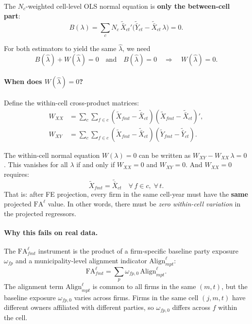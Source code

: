 \documentclass{article}
\newcommand{\FA}{\mathrm{FA}}
\theoremstyle{plain}
\theoremstyle{definition}
\begin{document}
The $N_c$-weighted cell-level OLS normal equation is \textbf{only the
between-cell part}:
\begin{equation}\label{eq:cell_normal}
  B(\lambda) = \sum_c N_c\, \tilde{\bar{X}}_{ct}'
  \bigl(\tilde{\bar{Y}}_{ct} - \tilde{\bar{X}}_{ct}\,\lambda\bigr) = 0.
\end{equation}

For both estimators to yield the same $\hat\lambda$, we need
\[
  B(\hat\lambda) + W(\hat\lambda) = 0
  \quad\text{and}\quad
  B(\hat\lambda) = 0
  \quad\Longrightarrow\quad
  W(\hat\lambda) = 0.
\]

\paragraph{When does $W(\hat\lambda) = 0$?}

Define the within-cell cross-product matrices:
\begin{align}
  W_{XX} &= \sum_c \sum_{f \in c}
    (\tilde{X}_{fmt} - \tilde{\bar{X}}_{ct})
    (\tilde{X}_{fmt} - \tilde{\bar{X}}_{ct})', \label{eq:Wxx} \\
  W_{XY} &= \sum_c \sum_{f \in c}
    (\tilde{X}_{fmt} - \tilde{\bar{X}}_{ct})
    (\tilde{Y}_{fmt} - \tilde{\bar{Y}}_{ct}). \label{eq:Wxy}
\end{align}

The within-cell normal equation $W(\lambda) = 0$ can be written as
$W_{XY} - W_{XX}\,\lambda = 0$.  This vanishes for all $\lambda$ if and only if
$W_{XX} = 0$ and $W_{XY} = 0$.  And $W_{XX} = 0$ requires:
\[
  \tilde{X}_{fmt} = \tilde{\bar{X}}_{ct}
  \quad\forall\, f \in c, \;\forall\, t.
\]
That is: after FE projection, every firm in the same cell-year must have the
\textbf{same} projected $\FA^\ell$ value.  In other words, there must be
\emph{zero within-cell variation} in the projected regressors.

\paragraph{Why this fails on real data.}

The $\FA^\ell_{fmt}$ instrument is the product of a firm-specific baseline party
exposure $\omega_{fp}$ and a municipality-level alignment indicator
$\mathrm{Align}^\ell_{mpt}$:
\[
  \FA^\ell_{fmt} = \sum_p \omega_{fp,0}\, \mathrm{Align}^\ell_{mpt}.
\]
The alignment term $\mathrm{Align}^\ell_{mpt}$ is common to all firms in the
same $(m, t)$, but the baseline exposure $\omega_{fp,0}$ varies across firms.
Firms in the same cell $(j, m, t)$ have different owners affiliated with
different parties, so $\omega_{fp,0}$ differs across $f$ within the cell.
\end{document}
